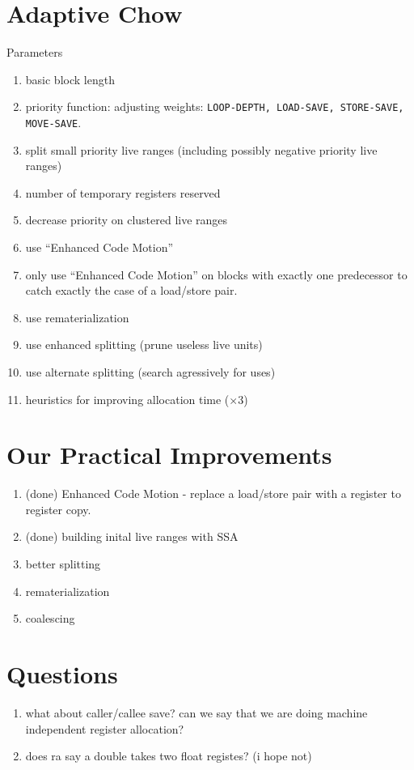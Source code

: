 \documentclass[11pt]{article}
\begin{document}
\section{Adaptive Chow}
Parameters
\begin{enumerate}
\item basic block length
\item priority function: adjusting weights: \texttt{LOOP-DEPTH,
LOAD-SAVE, STORE-SAVE, MOVE-SAVE}.
\item split small priority live ranges (including possibly negative
priority live ranges)
\item number of temporary registers reserved
\item decrease priority on clustered live ranges 
\item use ``Enhanced Code Motion''
\item only use ``Enhanced Code Motion'' on blocks with exactly one
predecessor to catch exactly the case of a load/store pair.
\item use rematerialization
\item use enhanced splitting (prune useless live units)
\item use alternate splitting (search agressively for uses)
\item heuristics for improving allocation time ($\times 3$)
\end{enumerate}


\section{Our Practical Improvements}
\begin{enumerate}
\item (done) Enhanced Code Motion - replace a load/store pair with a register
to register copy.
\item (done) building inital live ranges with SSA
\item better splitting
\item rematerialization
\item coalescing
\end{enumerate}

\section{Questions}
\begin{enumerate}
\item what about caller/callee save? can we say that we are doing
machine independent register allocation?

\item does ra say a double takes two float registes? (i hope not)
\end{enumerate}
\end{document}
